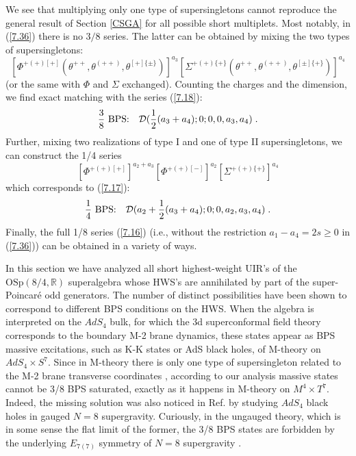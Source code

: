 \documentclass[a4paper,12pt]{article}
\begin{document}
We see that multiplying only one type of supersingletons cannot 
reproduce the general result of Section \ref{CSGA} for all 
possible short multiplets. Most notably, in (\ref{7.36}) there is 
no $3/8$ series. The latter can be obtained  by mixing the two 
types of supersingletons: 
\begin{equation}\label{7.37}
[\Phi^{+(+)[+]}(\theta^{++},\theta^{(++)},\theta^{[+]\{\pm\}})]^{a_3} 
[\Sigma^{+(+)\{+\}}(\theta^{++},\theta^{(++)},\theta^{[\pm]\{+\}})]^{a_4}
\end{equation}
(or the same with $\Phi$ and $\Sigma$ exchanged). Counting the 
charges and the dimension, we find exact matching with the series 
(\ref{7.18}):
\begin{equation}\label{7.37''}
 {3\over 8}  \mbox{ BPS:} \quad {\cal D}({1\over 2}(a_3+a_4);0;0,0,a_3,a_4)\;.  
\end{equation}
Further, mixing two realizations of type I and one of type II 
supersingletons, we can construct the 1/4 series 
\begin{equation}\label{7.38}
   [\Phi^{+(+)[+]}]^{a_2+a_3}[\Phi^{+(+)[-]}]^{a_2}
[\Sigma^{+(+)\{+\}}]^{a_4} 
\end{equation}
which corresponds to (\ref{7.17}):
\begin{equation}\label{7.37'''}
 {1\over 4}  \mbox{ BPS:} \quad 
{\cal D}(a_2 + {1\over 2}(a_3+a_4);0;0,a_2,a_3,a_4)\;.  
\end{equation} Finally, the full 1/8 series 
(\ref{7.16}) (i.e., without the restriction $a_1-a_4 = 2s\geq 0$ 
in (\ref{7.36})) can be obtained in a variety of ways. 

In this section we have analyzed all short highest-weight UIR's  
of the $\mbox{OSp}(8/4,\mathbb{R})$ superalgebra whose HWS's are 
annihilated by part of the super-Poincar\'{e} odd generators. The 
number of distinct possibilities have been shown to correspond to 
different BPS conditions on the HWS. When the algebra is 
interpreted on the $AdS_4$ bulk, for which the 3d superconformal 
field theory corresponds to the boundary M-2 brane dynamics, 
these states appear as BPS massive excitations, such as K-K 
states or AdS black holes, of M-theory on $AdS_4\times S^7$. 
Since in M-theory there is only one type of supersingleton 
related to the M-2 brane transverse coordinates \cite{Duff1}, 
according to our analysis massive states cannot be 3/8 BPS 
saturated, exactly as it happens in M-theory on $M^4\times T^7$. 
Indeed, the missing solution was also noticed in Ref. 
\cite{Duff2} by studying $AdS_4$ black holes in gauged $N=8$ 
supergravity. Curiously, in the ungauged theory, which is in some 
sense the flat limit of the former, the 3/8 BPS states are 
forbidden \cite{FMG} by the underlying $E_{7(7)}$ symmetry of 
$N=8$ supergravity \cite{CJ}.    
 
\end{document}
